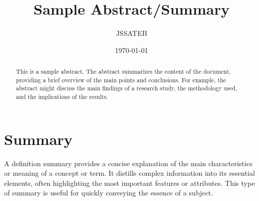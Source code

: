 \documentclass[12pt,a4paper]{article}
\title{Sample Abstract/Summary}
\author{JSSATEB}
\date{\today}
\begin{document}
	\maketitle

	\begin{abstract}
		This is a sample abstract. The abstract summarizes the content of the document, providing a brief overview of the main points and conclusions. For example, the abstract might discuss the main findings of a research study, the methodology used, and the implications of the results.
	\end{abstract}
	
	\section{Summary}
		A definition summary provides a concise explanation of the main characteristics or meaning of a concept or term. It distills complex information into its essential elements, often highlighting the most important features or attributes. This type of summary is useful for quickly conveying the essence of a subject.
\end{document}

